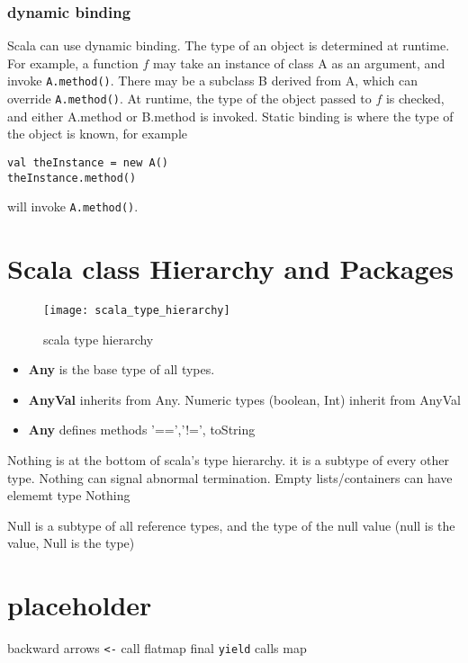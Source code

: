 \subsection{dynamic binding}
Scala can use dynamic binding. The type of an object is determined at runtime. For example, a function $f$ may take an instance of class A as an argument, and invoke \lstinline|A.method()|. There may be a subclass B derived from A, which can override \lstinline{A.method()}. At runtime, the type of the object passed to $f$ is checked, and either A.method or B.method is invoked. Static binding is where the type of the object is known, for example 
\begin{lstlisting}
val theInstance = new A()
theInstance.method()
\end{lstlisting} 
will invoke \lstinline|A.method()|. 

\chapter{Scala class Hierarchy and Packages}

\begin{figure}[hbp]
\texttt{[image: scala\_type\_hierarchy]}
\caption{scala type hierarchy}
\end{figure}


\begin{itemize}
\item { \bf Any} is the base type of all types.
\item {\bf AnyVal} inherits from Any. Numeric types (boolean, Int) inherit from AnyVal
\item {\bf Any} defines methods '==','!=', toString
\end{itemize}

Nothing is at the bottom of scala's type hierarchy. it is a subtype of every other type.
Nothing can signal abnormal termination.
Empty lists/containers can have elememt type Nothing

Null is a subtype of all reference types, and the type of the null value
(null is the value, Null is the type)



\chapter{placeholder}
backward arrows \lstinline|<-| call flatmap
final \lstinline|yield| calls map

